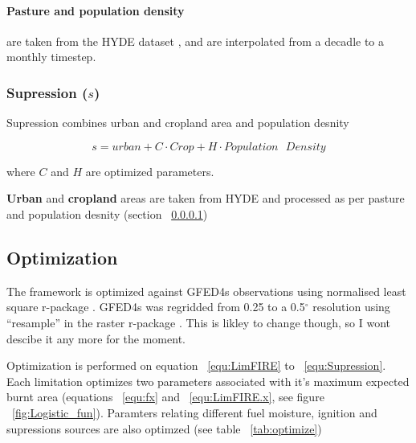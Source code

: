 \paragraph{Pasture and population density}
\label{Pasture}
are taken from the HYDE dataset \citep{klein2007mapping}, and are interpolated from a decadle to a monthly timestep.

\subsubsection{Supression ($s$)}

Supression combines urban and cropland area and population desnity

\begin{equation}
    s = urban + C \cdot Crop + H \cdot Population\text{ }Density
    \label{equ:Supression}
\end{equation}

where $C$ and $H$ are optimized parameters.

\textbf{Urban} and \textbf{cropland} areas are taken from HYDE and processed as per pasture and population desnity (section ~\ref{Pasture})


\subsection{Optimization}

\begin{shaded}
The framework is optimized against GFED4s observations \citep{Giglio2013}  using normalised least square r-package \citep{rstats}. GFED4s was regridded from 0.25 to a 0.5$^{\circ}$ resolution using ``resample'' in the raster r-package \citep{rraster}. This is likley to change though, so I wont descibe it any more for the moment.
\end{shaded}

Optimization is performed on equation ~\ref{equ:LimFIRE} to ~\ref{equ:Supression}. Each limitation optimizes two parameters associated with it's maximum expected burnt area (equations ~\ref{equ:fx} and ~\ref{equ:LimFIRE.x}, see figure ~\ref{fig:Logistic_fun}).
Paramters relating different fuel moisture, ignition and supressions sources are also optimzed (see table ~\ref{tab:optimize})

